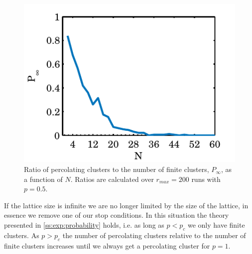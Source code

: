 \begin{figure}
	\centering
	\includegraphics[width=\columnwidth]{./img/assignment_b_p_infinite_ratio_p.pdf}
	\caption{Ratio of percolating clusters to the number of finite clusters, $P_\infty$, as a function of $N$. Ratios are calculated over $r_{max} = 200$ runs with $p = 0.5$.}
	\label{fig:experiment:size:prob:p_inf_ratio}
\end{figure}

If the lattice size is infinite we are no longer limited by the size of the lattice, in essence we remove one of our stop conditions. In this situation the theory presented in \cref{ss:exp:probability} holds, i.e. as long as $p < p_c$ we only have finite clusters. As $p > p_c$ the number of percolating clusters relative to the number of finite clusters increases until we always get a percolating cluster for $p = 1$.

	